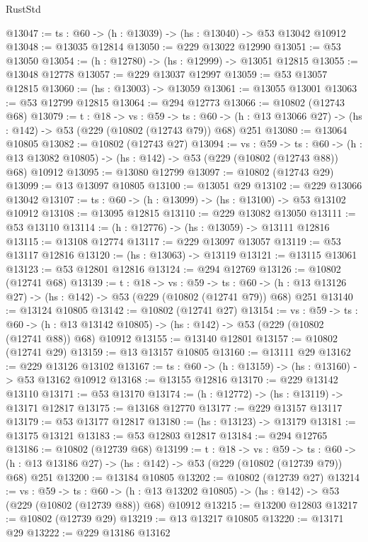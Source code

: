 \begin{lexlean}{RustStd}
\begin{coremodule}
@13047 := {ts : @60} -> (h : @13039) -> (hs : @13040) -> @53 @13042 @10912
@13048 := @13035 @12814
@13050 := @229 @13022 @12990
@13051 := @53 @13050
@13054 := (h : @12780) -> (hs : @12999) -> @13051 @12815
@13055 := @13048 @12778
@13057 := @229 @13037 @12997
@13059 := @53 @13057 @12815
@13060 := (hs : @13003) -> @13059
@13061 := @13055 @13001
@13063 := @53 @12799 @12815
@13064 := @294 @12773
@13066 := @10802 (@12743 @68)
@13079 := {t : @18} ->
  {vs : @59} ->
  {ts : @60} -> (h : @13 @13066 @27) -> (hs : @142) -> @53 (@229 (@10802 (@12743 @79)) @68) @251
@13080 := @13064 @10805
@13082 := @10802 (@12743 @27)
@13094 := {vs : @59} ->
  {ts : @60} ->
  (h : @13 @13082 @10805) -> (hs : @142) -> @53 (@229 (@10802 (@12743 @88)) @68) @10912
@13095 := @13080 @12799
@13097 := @10802 (@12743 @29)
@13099 := @13 @13097 @10805
@13100 := @13051 @29
@13102 := @229 @13066 @13042
@13107 := {ts : @60} -> (h : @13099) -> (hs : @13100) -> @53 @13102 @10912
@13108 := @13095 @12815
@13110 := @229 @13082 @13050
@13111 := @53 @13110
@13114 := (h : @12776) -> (hs : @13059) -> @13111 @12816
@13115 := @13108 @12774
@13117 := @229 @13097 @13057
@13119 := @53 @13117 @12816
@13120 := (hs : @13063) -> @13119
@13121 := @13115 @13061
@13123 := @53 @12801 @12816
@13124 := @294 @12769
@13126 := @10802 (@12741 @68)
@13139 := {t : @18} ->
  {vs : @59} ->
  {ts : @60} -> (h : @13 @13126 @27) -> (hs : @142) -> @53 (@229 (@10802 (@12741 @79)) @68) @251
@13140 := @13124 @10805
@13142 := @10802 (@12741 @27)
@13154 := {vs : @59} ->
  {ts : @60} ->
  (h : @13 @13142 @10805) -> (hs : @142) -> @53 (@229 (@10802 (@12741 @88)) @68) @10912
@13155 := @13140 @12801
@13157 := @10802 (@12741 @29)
@13159 := @13 @13157 @10805
@13160 := @13111 @29
@13162 := @229 @13126 @13102
@13167 := {ts : @60} -> (h : @13159) -> (hs : @13160) -> @53 @13162 @10912
@13168 := @13155 @12816
@13170 := @229 @13142 @13110
@13171 := @53 @13170
@13174 := (h : @12772) -> (hs : @13119) -> @13171 @12817
@13175 := @13168 @12770
@13177 := @229 @13157 @13117
@13179 := @53 @13177 @12817
@13180 := (hs : @13123) -> @13179
@13181 := @13175 @13121
@13183 := @53 @12803 @12817
@13184 := @294 @12765
@13186 := @10802 (@12739 @68)
@13199 := {t : @18} ->
  {vs : @59} ->
  {ts : @60} -> (h : @13 @13186 @27) -> (hs : @142) -> @53 (@229 (@10802 (@12739 @79)) @68) @251
@13200 := @13184 @10805
@13202 := @10802 (@12739 @27)
@13214 := {vs : @59} ->
  {ts : @60} ->
  (h : @13 @13202 @10805) -> (hs : @142) -> @53 (@229 (@10802 (@12739 @88)) @68) @10912
@13215 := @13200 @12803
@13217 := @10802 (@12739 @29)
@13219 := @13 @13217 @10805
@13220 := @13171 @29
@13222 := @229 @13186 @13162

\end{coremodule}
\end{lexlean}
